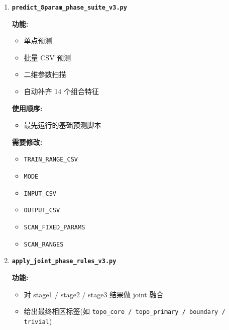 \documentclass[lang=cn,scheme=chinese,color=blue,device=normal,toc=onecol,math=cm]{elegantbook}
\begin{document}
\begin{enumerate}
\item \textbf{\texttt{predict\_\allowbreak{}8param\_\allowbreak{}phase\_\allowbreak{}suite\_\allowbreak{}v3.py}}\par
 
\textbf{功能:}\par
 
\begin{itemize}
\item 单点预测
\item 批量 CSV 预测
\item 二维参数扫描
\item 自动补齐 14 个组合特征
\end{itemize}
 
\textbf{使用顺序:}\par
 
\begin{itemize}
\item 最先运行的基础预测脚本
\end{itemize}
 
\textbf{需要修改:}\par
 
\begin{itemize}
\item \texttt{TRAIN\_\allowbreak{}RANGE\_\allowbreak{}CSV}
\item \texttt{MODE}
\item \texttt{INPUT\_\allowbreak{}CSV}
\item \texttt{OUTPUT\_\allowbreak{}CSV}
\item \texttt{SCAN\_\allowbreak{}FIXED\_\allowbreak{}PARAMS}
\item \texttt{SCAN\_\allowbreak{}RANGES}
\end{itemize}
\item \textbf{\texttt{apply\_\allowbreak{}joint\_\allowbreak{}phase\_\allowbreak{}rules\_\allowbreak{}v3.py}}\par
 
\textbf{功能:}\par
 
\begin{itemize}
\item 对 stage1 /\allowbreak{} stage2 /\allowbreak{} stage3 结果做 joint 融合
\item 给出最终相区标签(如 \texttt{topo\_\allowbreak{}core /\allowbreak{} topo\_\allowbreak{}primary /\allowbreak{} boundary /\allowbreak{} trivial})
\end{itemize}
 

\end{enumerate}
\end{document}

